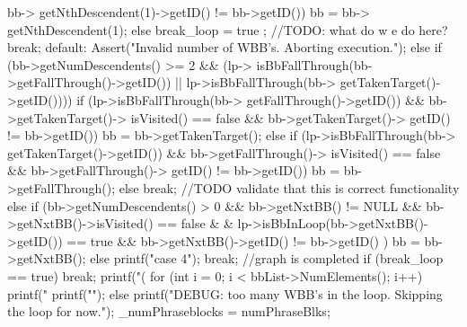 \begin{DoxyCode}
{{{{{{                                                                 bb->
      getNthDescendent(1)->getID() != bb->getID())
                                                                bb = bb->
      getNthDescendent(1);
                                                        else
                                                                break_loop = true
      ;
                                                                //TODO: what do w
      e do here?
                                                        break;
                                                default:
                                                        Assert("Invalid number of
       WBB's. Aborting execution.");
                                        }
                                } else if (bb->getNumDescendents() >= 2 && (lp->
      isBbFallThrough(bb->getFallThrough()->getID()) || lp->isBbFallThrough(bb->
      getTakenTarget()->getID()))) {
                                        if (lp->isBbFallThrough(bb->
      getFallThrough()->getID()) &&
                                                           bb->getTakenTarget()->
      isVisited() == false &&
                                                           bb->getTakenTarget()->
      getID() != bb->getID()) {
                                                bb = bb->getTakenTarget();
                                        } else if (lp->isBbFallThrough(bb->
      getTakenTarget()->getID()) &&
                                                           bb->getFallThrough()->
      isVisited() == false &&
                                                           bb->getFallThrough()->
      getID() != bb->getID()) {
                                                bb = bb->getFallThrough();
                                        } else {
                                                break; //TODO validate that this 
      is correct functionality
                                        }
                                } else if (bb->getNumDescendents() > 0 &&
                                                   bb->getNxtBB() != NULL &&
                                           bb->getNxtBB()->isVisited() == false &
      & 
                                                   lp->isBbInLoop(bb->getNxtBB()-
      >getID()) == true &&
                                           bb->getNxtBB()->getID() != bb->getID()
      ) {
                                        bb = bb->getNxtBB();
                                } else {
                                        printf("case 4\n");
                                        break; //graph is completed
                                }
                                if (break_loop == true) break;
                        }
                        printf("\nPHRASE (%
                        for (int i = 0; i < bbList->NumElements(); i++) {
                                printf("%
                        }
                        printf("\n");
                }
        } else {
                printf("DEBUG: too many WBB's in the loop. Skipping the loop for 
      now.\n");
        }
        _numPhraseblocks = numPhraseBlks;
}
\end{DoxyCode}
